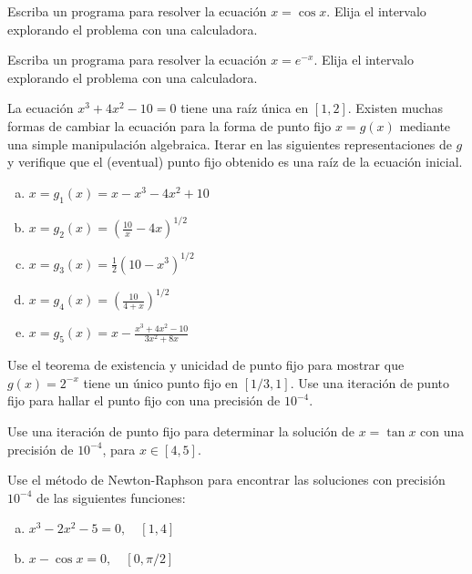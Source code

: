 \documentclass[11pt]{article}
\begin{document}
\begin{question} %
Escriba un programa para resolver la ecuación $x = \cos x$. Elija el intervalo explorando el problema con una calculadora.
\end{question}

\begin{question} %
    Escriba un programa para resolver la ecuación $x = e^{-x}$. Elija el intervalo explorando el problema con una calculadora.
\end{question}

\begin{question} %
La ecuación $x^3 + 4 x^2 - 10 = 0$ tiene una raíz única en $[1, 2]$. Existen muchas formas de cambiar la ecuación para la forma de punto fijo $x = g(x)$ mediante una simple manipulación algebraica. Iterar en las siguientes representaciones de $g$ y verifique que el (eventual) punto fijo obtenido es una raíz de la ecuación inicial.
\begin{enumerate}[a)]
    \item $x = g_1(x) = x - x^3 - 4 x^2 + 10$
    \item $x = g_2(x) = \left( \frac{10}{x} - 4 x \right)^{1/2}$
    \item $x = g_3(x) = \frac{1}{2} (10 - x^3)^{1/2}$
    \item $x = g_4(x) = \left( \frac{10}{4 + x} \right)^{1/2}$
    \item $x = g_5(x) = x - \frac{x^3 + 4 x^2 - 10}{3 x^2 + 8 x}$
\end{enumerate}
\end{question}

\begin{question} %
    Use el teorema de existencia y unicidad de punto fijo para mostrar que $g(x) = 2^{-x}$ tiene un único punto fijo en $[1/3, 1]$. Use una iteración de punto fijo para hallar el punto fijo con una precisión de $10^{-4}$. 
\end{question}

\begin{question} %
    Use una iteración de punto fijo para determinar la solución de $x = \tan x$ con una precisión de $10^{-4}$, para $x \in [4, 5]$.
\end{question}

\begin{question} %
    Use el método de Newton-Raphson para encontrar las soluciones con precisión $10^{-4}$ de las siguientes funciones:
\begin{enumerate}[a)]
    \item $x^3 - 2 x^2 - 5 = 0, \quad [1, 4]$
    \item $x - \cos x = 0, \quad [0, \pi/2]$
\end{enumerate}
\end{question}
\end{document}
